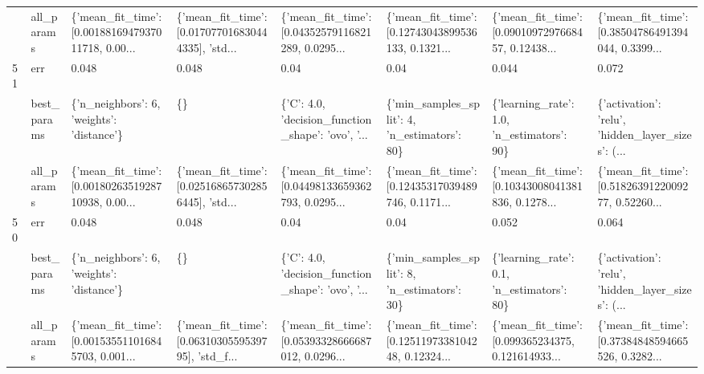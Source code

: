 \begin{tabular}{llllllll}
   & all\_params &  \{'mean\_fit\_time': [0.0018816947937011718, 0.00... &  \{'mean\_fit\_time': [0.017077016830444335], 'std... &  \{'mean\_fit\_time': [0.04352579116821289, 0.0295... &  \{'mean\_fit\_time': [0.12743043899536133, 0.1321... &  \{'mean\_fit\_time': [0.0901097297668457, 0.12438... &  \{'mean\_fit\_time': [0.38504786491394044, 0.3399... \\
51 & err &                                              0.048 &                                              0.048 &                                               0.04 &                                               0.04 &                                              0.044 &                                              0.072 \\
   & best\_params &          \{'n\_neighbors': 6, 'weights': 'distance'\} &                                                 \{\} &  \{'C': 4.0, 'decision\_function\_shape': 'ovo', '... &       \{'min\_samples\_split': 4, 'n\_estimators': 80\} &         \{'learning\_rate': 1.0, 'n\_estimators': 90\} &  \{'activation': 'relu', 'hidden\_layer\_sizes': (... \\
   & all\_params &  \{'mean\_fit\_time': [0.0018026351928710938, 0.00... &  \{'mean\_fit\_time': [0.025168657302856445], 'std... &  \{'mean\_fit\_time': [0.04498133659362793, 0.0295... &  \{'mean\_fit\_time': [0.12435317039489746, 0.1171... &  \{'mean\_fit\_time': [0.10343008041381836, 0.1278... &  \{'mean\_fit\_time': [0.5182639122009277, 0.52260... \\
50 & err &                                              0.048 &                                              0.048 &                                               0.04 &                                               0.04 &                                              0.052 &                                              0.064 \\
   & best\_params &          \{'n\_neighbors': 6, 'weights': 'distance'\} &                                                 \{\} &  \{'C': 4.0, 'decision\_function\_shape': 'ovo', '... &       \{'min\_samples\_split': 8, 'n\_estimators': 30\} &         \{'learning\_rate': 0.1, 'n\_estimators': 80\} &  \{'activation': 'relu', 'hidden\_layer\_sizes': (... \\
   & all\_params &  \{'mean\_fit\_time': [0.001535511016845703, 0.001... &  \{'mean\_fit\_time': [0.0631030559539795], 'std\_f... &  \{'mean\_fit\_time': [0.05393328666687012, 0.0296... &  \{'mean\_fit\_time': [0.1251197338104248, 0.12324... &  \{'mean\_fit\_time': [0.099365234375, 0.121614933... &  \{'mean\_fit\_time': [0.37384848594665526, 0.3282... \\
\bottomrule
\end{tabular}
